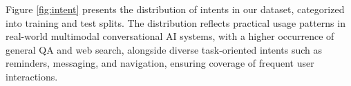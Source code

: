 Figure \ref{fig:intent} presents the distribution of intents in our dataset, categorized into training and test splits. The distribution reflects practical usage patterns in real-world multimodal conversational AI systems, with a higher occurrence of general QA and web search, alongside diverse task-oriented intents such as reminders, messaging, and navigation, ensuring coverage of frequent user interactions.








